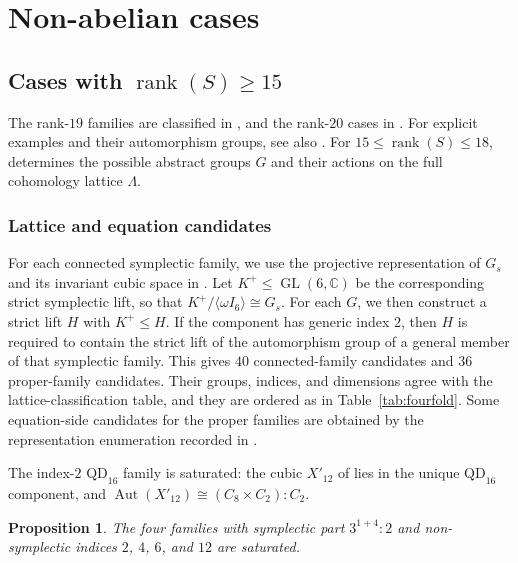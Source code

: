 \documentclass[12pt]{amsart}
\numberwithin{equation}{section}
\theoremstyle{plain}
\newtheorem{prop}[thm]{Proposition}
\theoremstyle{definition}
\theoremstyle{remark}
\newcommand{\CC}{\mathbb C}
\DeclareMathOperator{\Aut}{Aut}
\DeclareMathOperator{\GL}{GL}
\DeclareMathOperator{\rank}{rank}
\begin{document}
\section{Non-abelian cases}

\subsection{Cases with \texorpdfstring{$\rank(S)\geq15$}{rank(S) at least 15}}
\label{sec:large-symplectic}

The rank-$19$ families are classified in \cite[Theorem~1.2 and
\S6]{FWZ26}, and the rank-$20$ cases in
\cite[Theorem~1.2(9), Theorem~1.8, and \S\S4.5, 6.3]{laza2022automorphisms}.
For explicit examples and their automorphism groups, see also
\cite[\S6.1 and Theorems~6.14--6.15]{yang2024automorphism}.
For $15\leq\rank(S)\leq18$, \cite{FZ26} determines the possible abstract
groups $G$ and their actions on the full cohomology lattice $\Lambda$.

\subsubsection{Lattice and equation candidates}

For each connected symplectic family, we use the projective representation
of $G_s$ and its invariant cubic space in \cite{KOIKE202512,KOIKE2026}.  Let
$K^+\leq\GL(6,\CC)$ be the corresponding strict symplectic lift, so that
$K^+/\langle\omega I_6\rangle\cong G_s$.  For each $G$, we then construct a
strict lift $H$ with $K^+\leq H$.  If the component has generic index $2$,
then $H$ is required to contain the strict lift of the automorphism group
of a general member of that symplectic family.
This gives $40$ connected-family candidates and $36$ proper-family
candidates.  Their groups, indices, and dimensions agree with the
lattice-classification table, and they are ordered as in
Table~\ref{tab:fourfold}.
Some equation-side candidates for the proper families are obtained by the
representation enumeration recorded in 
\cite{FuWangZhengAutcub4fold2026}.

The index-$2$ $\mathrm{QD}_{16}$ family is saturated: the cubic $X'_{12}$ of
\cite[\S6.1, (12)]{yang2024automorphism} lies in the unique
$\mathrm{QD}_{16}$ component, and
$\Aut(X'_{12})\cong(C_8\times C_2):C_2$.

\begin{prop}\label{prop:extraspecial-saturation}
The four families with symplectic part $3^{1+4}:2$ and non-symplectic
indices $2$, $4$, $6$, and $12$ are saturated.
\end{prop}
\end{document}
